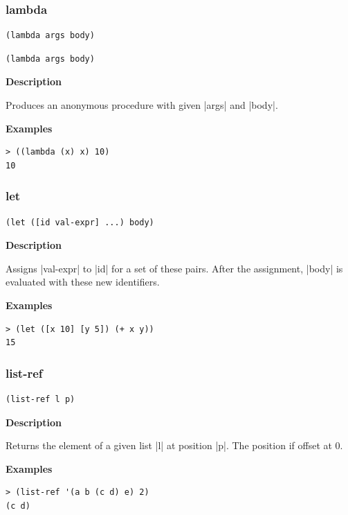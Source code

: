 \documentclass[a4paper]{article}
\begin{document}
\subsubsection{lambda}

\begin{lstlisting}[frame=none,belowskip=0pt]
(lambda args body)
\end{lstlisting}
\begin{lstlisting}[frame=none,language=SchemeLambda,aboveskip=0pt]
(lambda args body)
\end{lstlisting}

\textbf{Description}

Produces an anonymous procedure with given |args| and |body|.

\textbf{Examples}

\begin{lstlisting}
> ((lambda (x) x) 10)
10
\end{lstlisting}

\subsubsection{let}

\begin{lstlisting}[frame=none]
(let ([id val-expr] ...) body)
\end{lstlisting}

\textbf{Description}

Assigns |val-expr| to |id| for a set of these pairs. After the assignment, |body| is evaluated with these new identifiers.

\textbf{Examples}

\begin{lstlisting}
> (let ([x 10] [y 5]) (+ x y))
15
\end{lstlisting}

\subsubsection{list-ref}

\begin{lstlisting}[frame=none]
(list-ref l p)
\end{lstlisting}

\textbf{Description}

Returns the element of a given list |l| at position |p|. The position if offset at 0.

\textbf{Examples}

\begin{lstlisting}
> (list-ref '(a b (c d) e) 2)
(c d)
\end{lstlisting}
\end{document}
